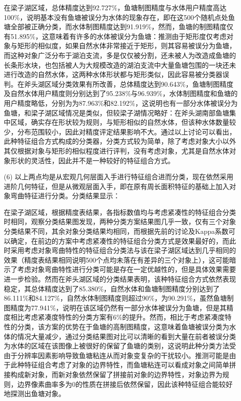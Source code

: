 \documentclass[supercite]{upcthesis}
\begin{document}
\begin{itemize}
在梁子湖区域，总体精度达到92.727\%，鱼塘制图精度与水体用户精度高达100\%，说明基本没有鱼塘被误分为水体的现象存在，即在这500个随机点处鱼塘全部被正确分类，而水体制图精度达到91.919\%，然而，鱼塘的制图精度仅有51.895\%，这意味着有许多的水体被误分为鱼塘：推测由于矩形度仅考虑对象与矩形的相似度，如果自然水体非常接近于矩形，则其容易被误分为鱼塘，而这种对象广泛分布于湖泊支流，多是仅仅被分割，还未被人为改造成鱼塘的长条形水块，也包括被人为大规模改造的湖泊支流中大量鱼塘包围的一块还未进行改造的自然水体，这两种水体形状都与矩形类似，因此容易被分类器误判。在斧头湖区域分类效果有所改善，总体精度达到90.643\%，鱼塘制图精度及自然水体用户精度则分别达到了95.238\%与96.939\%，水体制图精度和鱼塘的用户精度略低，分别为为87.963\%和82.192\%，这说明也有一部分水体被误分为鱼塘，和梁子湖区域情况是类似，但较梁子湖情况略好：在斧头湖南部鱼塘集中区域，确实存在形状较为规则，与矩形相似的自然水体，但该种水体数量较少，分布范围较小，因此对精度评定结果影响不大。通过以上讨论可以看出，此种特征组合方式构成的分类器，分类方式较为简单，除了考虑对象大小以外其仅根据对象与矩形的相似程度进行评判，没有考虑对象，尤其是自然水体对象形状的灵活性，因此并不是一种较好的特征组合方式。
\item[(6)]以上两点均是从宏观几何层面入手进行特征组合进而分类，现在依然采用进阶几何特征，但是从微观层面入手，即在原有周长面积特征的基础上加入对象弯曲特征进行分类。分类结果显示：

在梁子湖区域，根据精度表结果，各指标数值均与考虑紧凑性的特征组合分类时相同，观察分类结果图发现，两种分类方案结果图几乎一致，仅有三个对象分类结果不同，其余对象分类结果均相同，而根据先前的讨论及Kappa系数可以确定，在前边的方案中考虑紧凑性的特征组合分类方式是效果最好的，而此时采用考虑对象弯曲特性的特征组合分类法与该在梁子湖区域达到几乎相同的效果（精度表结果相同说明500个点均未落在有差异的三个对象上），这可能暗示了考虑对象弯曲特性进行分类可能是存在一定优越性的，但是具体效果需要进一步检验。然而在斧头湖区域的分类结果表明，该种特征组合方式依然表现稳定，其总体精度达到了85.380\%，自然水体和鱼塘制图精度分别达到了86.111\%和84.127\%，自然水体制图精度则超过90\%，为90.291\%，虽然鱼塘制图精度为77.941\%，说明在该区域仍然有一部分水体被误分为鱼塘，但是其精度相比考虑紧凑度特性的分类方案有6\%的提升。然而，相比于考虑紧凑度特性的分类，该方案的优势在于鱼塘的高制图精度，这意味着鱼塘被误分类为水体的情况大量减少，通过分类结果图对比可以清晰的看到大量在前者被误分类为水体的区域在该图像上被很好的保留了鱼塘的类别，这说明此种分类方法受由于分辨率因素影响导致鱼塘粘连从而对象变复杂的干扰较小。推测可能是由于此种特征组合考虑了对象的边界特性，而鱼塘粘连可以看成对象之间简单拼接构成新对象，而新对象依然保留了拼接前对象的边界特性，对象边界为规则，边界像素曲率多为0的性质在拼接后依然保留，因此该种特征组合能较好地探测出鱼塘对象。


\end{itemize}
\end{document}
